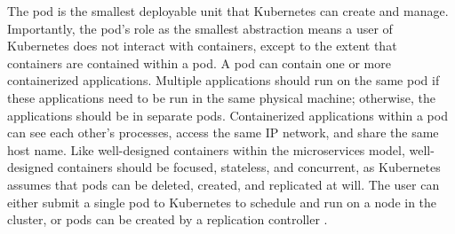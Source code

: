 The pod is the smallest deployable unit that Kubernetes can create and
manage. Importantly, the pod's role as the smallest abstraction means a user of
Kubernetes does not interact with containers, except to the extent that
containers are contained within a pod. A pod can contain one or more
containerized applications. Multiple applications should run on the same pod
if these applications need to be run in the same
physical machine; otherwise, the applications should be in separate pods.
Containerized applications within a pod can see each other's processes,
access the same IP network, and share the same host name. Like well-designed
containers within the microservices model, well-designed containers should be
focused, stateless, and concurrent, as Kubernetes assumes that pods can be deleted,
created, and replicated at will. The user can either submit a
single pod to Kubernetes to schedule and run on a node in the cluster, or pods
can be created by a replication controller \cite{k8s-pods}.
